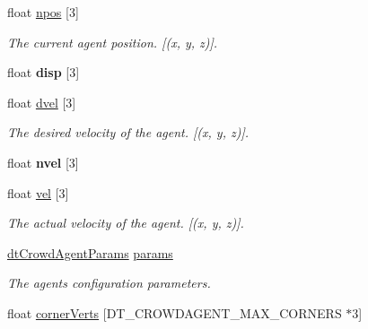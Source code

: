 \begin{DoxyCompactItemize}
float \hyperlink{structdtCrowdAgent_a7fca233de63765485755b1d3fac0dc97}{npos} \mbox{[}3\mbox{]}
\begin{DoxyCompactList}\small\item\em The current agent position. \mbox{[}(x, y, z)\mbox{]}. \end{DoxyCompactList}\item 
\mbox{\label{structdtCrowdAgent_ac9a3833e430a133bde18698e8e3a93f5}} 
float {\bfseries disp} \mbox{[}3\mbox{]}
\item 
\mbox{\label{structdtCrowdAgent_a14233e0e769a8df1d1931ab878bc0333}} 
float \hyperlink{structdtCrowdAgent_a14233e0e769a8df1d1931ab878bc0333}{dvel} \mbox{[}3\mbox{]}
\begin{DoxyCompactList}\small\item\em The desired velocity of the agent. \mbox{[}(x, y, z)\mbox{]}. \end{DoxyCompactList}\item 
\mbox{\label{structdtCrowdAgent_ab37117892b55e16a078cf446ce5763a9}} 
float {\bfseries nvel} \mbox{[}3\mbox{]}
\item 
\mbox{\label{structdtCrowdAgent_af549e32118e5b42db1da5ee244d7d4b0}} 
float \hyperlink{structdtCrowdAgent_af549e32118e5b42db1da5ee244d7d4b0}{vel} \mbox{[}3\mbox{]}
\begin{DoxyCompactList}\small\item\em The actual velocity of the agent. \mbox{[}(x, y, z)\mbox{]}. \end{DoxyCompactList}\item 
\mbox{\label{structdtCrowdAgent_acd1b22112639114ce05c793d178eb4b5}} 
\hyperlink{structdtCrowdAgentParams}{dt\+Crowd\+Agent\+Params} \hyperlink{structdtCrowdAgent_acd1b22112639114ce05c793d178eb4b5}{params}
\begin{DoxyCompactList}\small\item\em The agent\textquotesingle{}s configuration parameters. \end{DoxyCompactList}\item 
\mbox{\label{structdtCrowdAgent_af64ea4c39bf846283f8f2386ae03ab39}} 
float \hyperlink{structdtCrowdAgent_af64ea4c39bf846283f8f2386ae03ab39}{corner\+Verts} \mbox{[}D\+T\+\_\+\+C\+R\+O\+W\+D\+A\+G\+E\+N\+T\+\_\+\+M\+A\+X\+\_\+\+C\+O\+R\+N\+E\+RS $\ast$3\mbox{]}

\end{DoxyCompactItemize}
